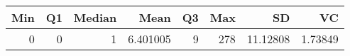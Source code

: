 
\begin{tabular}[t]{rrrrrrrr}
\toprule
Min & Q1 & Median & Mean & Q3 & Max & SD & VC\\
\midrule
0 & 0 & 1 & 6.401005 & 9 & 278 & 11.12808 & 1.73849\\
\bottomrule
\end{tabular}